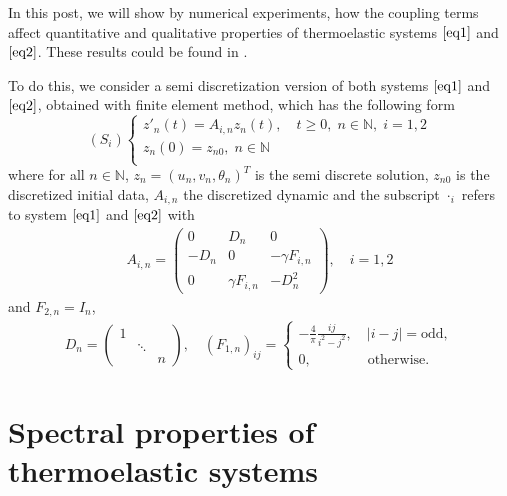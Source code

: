 \documentclass [reqno]{amsart}
\begin{document}
In this post, we will show by numerical experiments, how the coupling terms affect quantitative and qualitative properties of thermoelastic systems $\eqref{eq1}$ and $\eqref{eq2}$. These results could be found in \cite{LZb1994,MN2016}.

To do this, we consider a semi discretization version of both systems $\eqref{eq1}$ and $\eqref{eq2}$, obtained with finite element method, which has the following form
\begin{equation}
\label{eq3}
\tag{3}
 (S_i)\left\{\begin{array}{ll}
 z'_n(t)=A_{i,n} z_n(t),\quad t\geq 0,\;n\in\mathbb{N},\;i=1,2\\
 z_n(0)=z_{n0},\;n\in\mathbb{N}\\
\end{array}
\right.
\end{equation}
where for all $n\in\mathbb{N}$, $z_n=(u_n,v_n,\theta_n)^T$ is the semi discrete solution, $z_{n0}$ is the discretized initial data, $A_{i,n}$ the discretized dynamic and the subscript $\cdot_i$ refers to system $\eqref{eq1}$ and $\eqref{eq2}$ with  
\begin{align*}
A_{i,n}=\left(\begin{matrix}
                    0 & D_n & 0\\
	       -D_n & 0 & -\gamma F_{i,n}\\
		    0 & \gamma F_{i,n} & -D_n^2
                   \end{matrix}
\right),\quad i=1,2
\end{align*}
and $F_{2,n}=I_n$, 
\begin{align*}
D_n=\left(\begin{matrix}
                    1 &  & \\
	        & \ddots &  \\
		     &   & n
                   \end{matrix}
\right),\quad (F_{1,n})_{ij}=\left\{\begin{array}{ll}
 -\frac{4}{\pi}\frac{ij}{i^2-j^2},\quad |i-j|=\text{odd},\\
 0,\qquad\qquad\text{otherwise}.
\end{array}
\right.
\end{align*}

\section*{\bf Spectral properties of thermoelastic systems}
\end{document}

